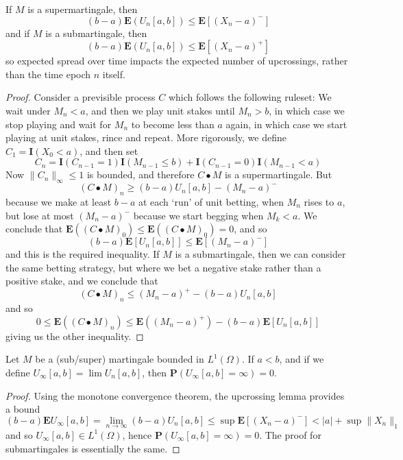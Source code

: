 \begin{theorem}
    If $M$ is a supermartingale, then
    \[ (b-a) \mathbf{E}(U_n[a,b]) \leq \mathbf{E}[(X_n - a)^-] \]
    and if $M$ is a submartingale, then
    \[ (b-a) \mathbf{E}(U_n[a,b]) \leq \mathbf{E}[(X_n - a)^+] \]
    so expected spread over time impacts the expected number of upcrossings, rather than the time epoch $n$ itself.
\end{theorem}
\begin{proof}
    Consider a previsible process $C$ which follows the following ruleset: We wait under $M_n < a$, and then we play unit stakes until $M_n > b$, in which case we stop playing and wait for $M_n$ to become less than $a$ again, in which case we start playing at unit stakes, rince and repeat. More rigorously, we define $C_1 = \mathbf{I}(X_0 < a)$, and then set
    \[ C_n = \mathbf{I}(C_{n-1} = 1) \mathbf{I}(M_{n-1} \leq b) + \mathbf{I}(C_{n-1} = 0) \mathbf{I}(M_{n-1} < a) \]
    Now $\| C_n \|_\infty \leq 1$ is bounded, and therefore $C \bullet M$ is a supermartingale. But
    \[ (C \bullet M)_n \geq (b-a) U_n[a,b] - (M_n - a)^- \]
    because we make at least $b-a$ at each `run' of unit betting, when $M_n$ rises to $a$, but lose at most $(M_n - a)^-$ because we start begging when $M_k < a$. We conclude that $\mathbf{E}((C \bullet M)_0) \leq \mathbf{E}((C \bullet M)_0) = 0$, and so
    \[ (b-a) \mathbf{E}[U_n[a,b]] \leq \mathbf{E}[(M_n - a)^-] \]
    and this is the required inequality. If $M$ is a submartingale, then we can consider the same betting strategy, but where we bet a negative stake rather than a positive stake, and we conclude that
    \[ (C \bullet M)_n \leq (M_n - a)^+ -(b-a) U_n[a,b] \]
    and so
    \[ 0 \leq \mathbf{E}((C \bullet M)_n) \leq \mathbf{E}((M_n - a)^+) - (b-a) \mathbf{E}[U_n[a,b]] \]
    giving us the other inequality.
\end{proof}

\begin{corollary}
    Let $M$ be a (sub/super) martingale bounded in $L^1(\Omega)$. If $a < b$, and if we define $U_\infty[a,b] = \lim U_n[a,b]$, then $\mathbf{P}(U_\infty[a,b] = \infty) = 0$.
\end{corollary}
\begin{proof}
    Using the monotone convergence theorem, the upcrossing lemma provides a bound
    \[ (b - a) \mathbf{E} U_\infty [a,b] = \lim_{n \to \infty} (b-a) U_n[a,b] \leq \sup \mathbf{E}[(X_n - a)^-] < |a| + \sup \| X_n \|_1 \]
    and so $U_\infty[a,b] \in L^1(\Omega)$, hence $\mathbf{P}(U_\infty[a,b] = \infty) = 0$. The proof for submartingales is essentially the same.
\end{proof}

